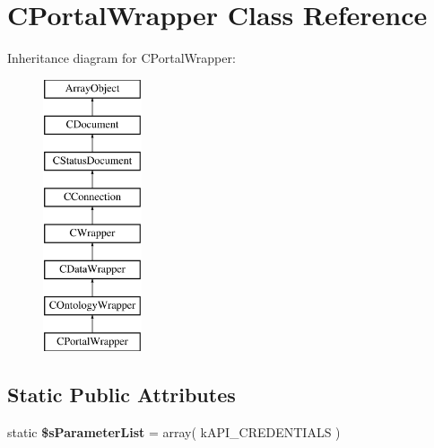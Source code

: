 \hypertarget{class_c_portal_wrapper}{\section{C\-Portal\-Wrapper Class Reference}
\label{class_c_portal_wrapper}
}
Inheritance diagram for C\-Portal\-Wrapper\-:\begin{figure}[H]
\begin{center}
\leavevmode
\includegraphics[height=8.000000cm]{class_c_portal_wrapper}
\end{center}
\end{figure}
\subsection*{Static Public Attributes}
\begin{DoxyCompactItemize}
\item 
\hypertarget{class_c_portal_wrapper_a958c92aeb9d0db3d7b67d3077da391f3}{static {\bfseries \$s\-Parameter\-List} = array( k\-A\-P\-I\-\_\-\-C\-R\-E\-D\-E\-N\-T\-I\-A\-L\-S )}\label{class_c_portal_wrapper_a958c92aeb9d0db3d7b67d3077da391f3}

\end{DoxyCompactItemize}
